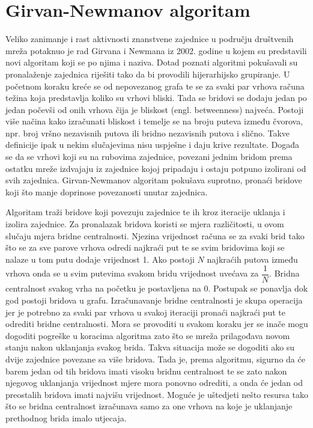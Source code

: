 \section{Girvan-Newmanov algoritam}

Veliko zanimanje i rast aktivnosti znanstvene zajednice u području društvenih mreža potaknuo je rad \cite{girvan2002community} Girvana i Newmana iz 2002. godine  u kojem su predstavili novi algoritam koji se po njima i naziva. Dotad poznati algoritmi pokušavali su pronalaženje zajednica riješiti tako da bi provodili hijerarhijsko grupiranje. U početnom koraku kreće se od nepovezanog grafa te se za svaki par vrhova računa težina koja predstavlja koliko su vrhovi bliski. Tada se bridovi se dodaju jedan po jedan počevši od onih vrhova čija je bliskost (engl. betweenness) najveća. Postoji više načina kako izračunati bliskost i temelje se na broju puteva između čvorova, npr. broj vršno nezavisnih putova ili bridno nezavisnih putova i slično. Takve definicije ipak u nekim slučajevima nisu uspješne i daju krive rezultate. Događa se da se vrhovi koji su na rubovima zajednice, povezani jednim bridom prema ostatku mreže izdvajaju iz zajednice kojoj pripadaju i ostaju potpuno izolirani od svih zajednica. Girvan-Newmanov algoritam pokušava suprotno, pronaći bridove koji što manje doprinose povezanosti unutar zajednica. 

Algoritam traži bridove koji povezuju zajednice te ih kroz iteracije uklanja i izolira zajednice. Za pronalazak bridova koristi se mjera različitosti, u ovom slučaju mjera bridne centralnosti. Njezina vrijednost računa se za svaki brid tako što se za sve parove vrhova odredi najkraći put te se svim bridovima koji se nalaze u tom putu dodaje vrijednost 1. Ako postoji $N$ najkraćih putova između vrhova onda se u svim putevima svakom bridu vrijednost uvećava za $ \dfrac{1}{N} $. Bridna centralnost svakog vrha na početku je postavljena na 0. Postupak se ponavlja dok god postoji bridova u grafu. Izračunavanje bridne centralnosti je skupa operacija jer je potrebno za svaki par vrhova u svakoj iteraciji pronaći najkraći put te odrediti bridne centralnosti. Mora se provoditi u svakom koraku jer se inače mogu dogoditi pogreške u koracima algoritma zato što se mreža prilagođava novom stanju nakon uklanjanja svakog brida. Takva situacija može se dogoditi ako su dvije zajednice povezane sa više bridova. Tada je, prema algoritmu, sigurno da će barem jedan od tih bridova imati visoku bridnu centralnost te se zato nakon njegovog uklanjanja vrijednost mjere mora ponovno odrediti, a onda će jedan od preostalih bridova imati najvišu vrijednost. Moguće je uštedjeti nešto resursa tako što se bridna centralnost izračunava samo za one vrhova na koje je uklanjanje prethodnog brida imalo utjecaja. 

